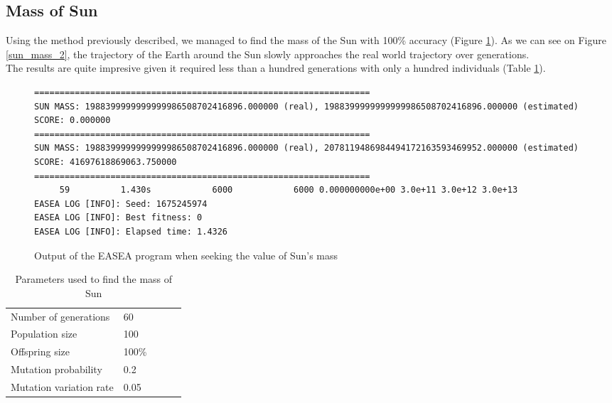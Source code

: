 \subsection{Mass of Sun}
Using the method previously described, we managed to find the mass of the Sun
with
100\% accuracy (Figure \ref{sun_mass_1}). As we can see on Figure
\ref{sun_mass_2}, the trajectory of the Earth around the Sun slowly approaches
the real world trajectory over generations.\\

The results are quite impresive given it required less than a hundred
generations with only a hundred individuals (Table \ref{sun_mass_table}).

\begin{figure}
    \begin{lstlisting}
==================================================================
SUN MASS: 1988399999999999986508702416896.000000 (real), 1988399999999999986508702416896.000000 (estimated)
SCORE: 0.000000
==================================================================
SUN MASS: 1988399999999999986508702416896.000000 (real), 2078119486984494172163593469952.000000 (estimated)
SCORE: 41697618869063.750000
==================================================================
     59          1.430s            6000            6000 0.000000000e+00 3.0e+11 3.0e+12 3.0e+13
EASEA LOG [INFO]: Seed: 1675245974
EASEA LOG [INFO]: Best fitness: 0
EASEA LOG [INFO]: Elapsed time: 1.4326
\end{lstlisting}
    \caption{Output of the EASEA program when seeking the value of Sun's mass}
    \label{sun_mass_1}
\end{figure}

\begin{table}
    \begin{tabular}{lllll}
        Number of generations   & 60    \\
        Population size         & 100   \\
        Offspring size          & 100\% \\
        Mutation probability    & 0.2   \\
        Mutation variation rate & 0.05
    \end{tabular}
    \caption{Parameters used to find the mass of Sun}
    \label{sun_mass_table}
\end{table}

